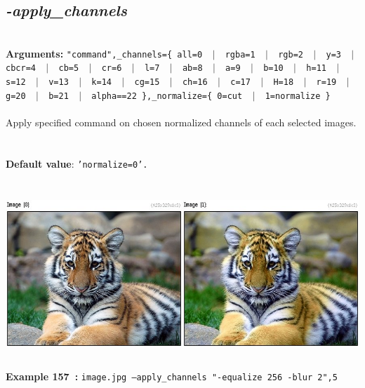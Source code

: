 \documentclass[a4paper,11pt,twoside]{book}
\begin{document}
\subsection{\emph{-apply\_channels} }\vspace*{-0.5em}
~\\\textbf{Arguments: } 
{\small \texttt{"command",\_channels=\{ all=0 ~$|$~ rgba=1 ~$|$~ rgb=2 ~$|$~ y=3 ~$|$~ cbcr=4 ~$|$~ cb=5 ~$|$~ cr=6 ~$|$~ l=7 ~$|$~ ab=8 ~$|$~ a=9 ~$|$~ b=10 ~$|$~ h=11 ~$|$~ s=12 ~$|$~ v=13 ~$|$~ k=14 ~$|$~ cg=15 ~$|$~ ch=16 ~$|$~ c=17 ~$|$~ H=18 ~$|$~ r=19 ~$|$~ g=20 ~$|$~ b=21 ~$|$~ alpha==22 \},\_normalize=\{ 0=cut ~$|$~ 1=normalize \}}}\\~\\
Apply specified command on chosen normalized channels of each selected images.
~\\~\\\textbf{Default value}: {\small \texttt{'normalize=0'.}}
\begin{center}\includegraphics[keepaspectratio=true,height=7cm,width=\textwidth]{img/gmic_def157.jpg}\\
{\footnotesize \textbf{Example 157~:} \texttt{image.jpg --apply\_channels "-equalize 256 -blur 2",5}}
\end{center}
\end{document}
